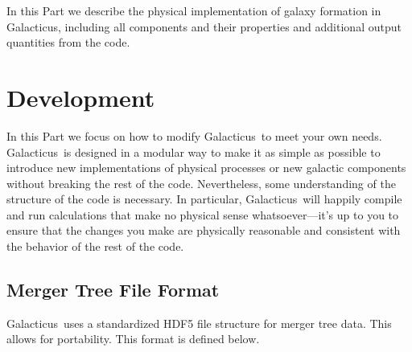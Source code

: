 \documentclass[letterpaper,10pt]{book}
\def\glc{{\sc Galacticus}}
\begin{document}
In this Part we describe the physical implementation of galaxy formation in \glc, including all components and their properties and additional output quantities from the code.







\part{Development}

In this Part we focus on how to modify \glc\ to meet your own needs. \glc\ is designed in a modular way to make it as simple as possible to introduce new implementations of physical processes or new galactic components without breaking the rest of the code. Nevertheless, some understanding of the structure of the code is necessary. In particular, \glc\ will happily compile and run calculations that make no physical sense whatsoever---it's up to you to ensure that the changes you make are physically reasonable and consistent with the behavior of the rest of the code.









\appendix

\chapter{Merger Tree File Format}\label{sec:MergerTreeFileFormat}

\glc\ uses a standardized HDF5 file structure for merger tree data. This allows for portability. This format is defined below.







\backmatter




\citeindextrue
\printindex
\end{document}
